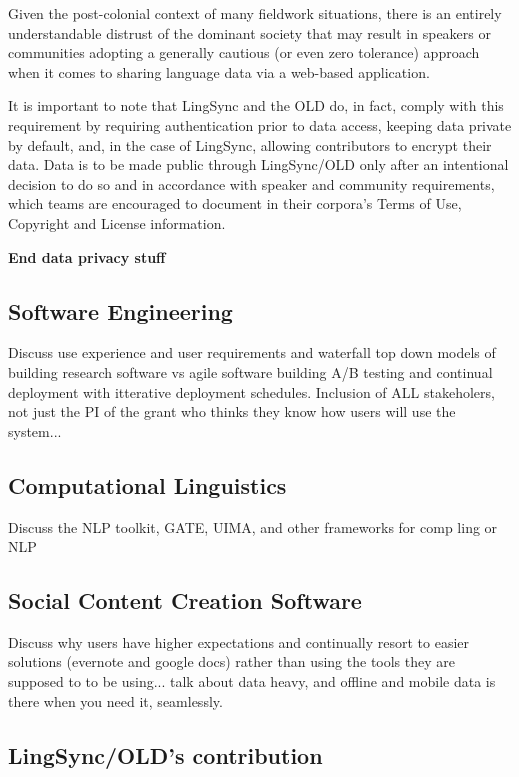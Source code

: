 \documentclass[11pt]{article}
\begin{document}
Given the post-colonial context of many fieldwork situations, there
is an entirely understandable distrust of the dominant society that may result
in speakers or communities adopting a generally cautious (or even zero
tolerance) approach when it comes to sharing language data via a web-based
application.

It is important to note that LingSync and the OLD do, in fact, comply with this
requirement by requiring authentication prior to data access, keeping data
private by default, and, in the case of LingSync, allowing contributors to
encrypt their data. Data is to be made public through LingSync/OLD only after
an intentional decision to do so and in accordance with speaker and community
requirements, which teams are encouraged to document in their corpora's Terms of
Use, Copyright and License information.


\textbf{End data privacy stuff}


\subsection{Software Engineering}

Discuss use experience and user requirements and waterfall top down models of building research software vs agile software building A/B testing and continual deployment with itterative deployment schedules.  Inclusion of ALL stakeholers, not just the PI of the grant who thinks they know how users will use the system...

\subsection{Computational Linguistics}


Discuss the NLP toolkit, GATE, UIMA, and other frameworks for comp ling or NLP

\subsection{Social Content Creation Software}


Discuss why users have higher expectations and continually resort to easier solutions (evernote and google docs) rather than using the tools they are supposed to to be using... talk about data heavy, and offline and mobile data is there when you need it, seamlessly. 


\subsection{LingSync/OLD's contribution}
\end{document}
